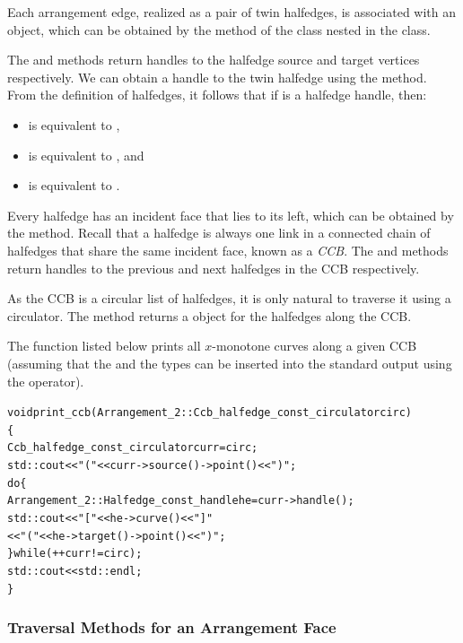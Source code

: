 Each arrangement edge, realized as a pair of twin halfedges,
is associated with an  object, which
can be obtained by the  method of the 
class nested in the  class.

The  and  methods return handles to
the halfedge source and target vertices respectively. We can
obtain a handle to the twin halfedge using the 
method. From the definition of halfedges, it follows that if
 is a halfedge handle, then:
\begin{itemize}
\item {} is equivalent to ,
\item {} is equivalent to , and
\item {} is equivalent to .
\end{itemize}

Every halfedge has an incident face that lies to its left, which
can be obtained by the  method. Recall that a
halfedge is always one link in a connected chain of halfedges that
share the same incident face, known as a {\em CCB}. The
 and  methods return handles to the
previous and next halfedges in the CCB respectively. 

As the CCB is a circular list of halfedges, it is only natural to 
traverse it using a circulator. The  method returns a 
 object for the
halfedges along the CCB.

The function  listed below prints all $x$-monotone
curves along a given CCB (assuming that the  and the
 types can be inserted into the standard output
using the \ccc{<<} operator).
\begin{alltt}
void print_ccb (Arrangement_2::Ccb_halfedge_const_circulator circ)
\{
  Ccb_halfedge_const_circulator curr = circ;
  std::cout << "(" << curr->source()->point() << ")";
  do \{
    Arrangement_2::Halfedge_const_handle he = curr->handle();
    std::cout << "   [" << he->curve() << "]   "
              << "(" << he->target()->point() << ")";
  \} while (++curr != circ);
  std::cout << std::endl;
\}
\end{alltt}

\subsubsection{Traversal Methods for an Arrangement Face}
\label{arr_sssec:tr_face}

